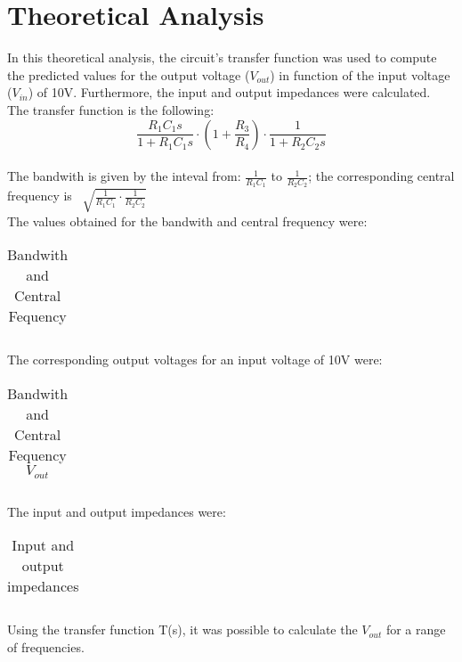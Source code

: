 \section{Theoretical Analysis}
\label{sec:analysis}

In this theoretical analysis, the circuit's transfer function was used to compute the predicted values for the output voltage ($V_{out}$) in function of the input voltage ($V_{in}$) of 10V. Furthermore, the input and output impedances were calculated.\\
The transfer function is the following: \[\frac{R_1C_1s}{1+R_1C_1s} \cdot (1+\frac{R_3}{R_4}) \cdot \frac{1}{1+R_2C_2s}\] \\

The bandwith is given by the inteval from: $\frac{1}{R_1C_1}$ to $\frac{1}{R_2C_2}$; the corresponding central frequency is \ $\sqrt{{\frac{1}{R_1C_1} \cdot \frac{1}{R_2C_2}}}$\\

The values obtained for the bandwith and central frequency were:

\FloatBarrier
\begin{table}[h]
  \centering
  \begin{tabular}{|c|c|}
    \hline    
    
    \hline
  \end{tabular}
  \caption{Bandwith and Central Fequency}
  \label{tab:Octave_cent}
\end{table}
\FloatBarrier

The corresponding output voltages for an input voltage of 10V were:
\FloatBarrier
\begin{table}[h]
  \centering
  \begin{tabular}{|c|c|}
    \hline    
    
    \hline
  \end{tabular}
  \caption{Bandwith and Central Fequency $V_{out}$}
  \label{tab:Octave_cent}
\end{table}

\FloatBarrier

The input and output impedances were:
\FloatBarrier
\begin{table}[h]
  \centering
  \begin{tabular}{|c|c|c|}
    \hline    
    
    \hline
  \end{tabular}
  \caption{Input and output impedances}
  \label{tab:Octave_cent}
\end{table}
\FloatBarrier

Using the transfer function T(s), it was possible to calculate the $V_{out}$ for a range of frequencies.

